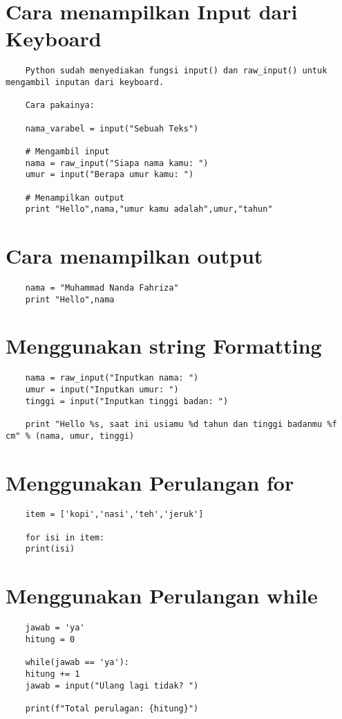 \documentclass{article}
\begin{document}
\section{Cara menampilkan Input dari Keyboard}
\begin{lstlisting}
	Python sudah menyediakan fungsi input() dan raw_input() untuk mengambil inputan dari keyboard.
	
	Cara pakainya:
	
	nama_varabel = input("Sebuah Teks")
	
	# Mengambil input
	nama = raw_input("Siapa nama kamu: ")
	umur = input("Berapa umur kamu: ")
	
	# Menampilkan output
	print "Hello",nama,"umur kamu adalah",umur,"tahun"
\end{lstlisting}

\section{Cara menampilkan output}
\begin{lstlisting}
	nama = "Muhammad Nanda Fahriza"
	print "Hello",nama
\end{lstlisting}

\section{Menggunakan string Formatting}
\begin{lstlisting}
	nama = raw_input("Inputkan nama: ")
	umur = input("Inputkan umur: ")
	tinggi = input("Inputkan tinggi badan: ")
	
	print "Hello %s, saat ini usiamu %d tahun dan tinggi badanmu %f cm" % (nama, umur, tinggi)
\end{lstlisting}

\section{Menggunakan Perulangan for}
\begin{lstlisting}
	item = ['kopi','nasi','teh','jeruk']
	
	for isi in item:
	print(isi)
\end{lstlisting}

\section{Menggunakan Perulangan while}
\begin{lstlisting}
	jawab = 'ya'
	hitung = 0
	
	while(jawab == 'ya'):
	hitung += 1
	jawab = input("Ulang lagi tidak? ")
	
	print(f"Total perulagan: {hitung}")
\end{lstlisting}
\end{document}
